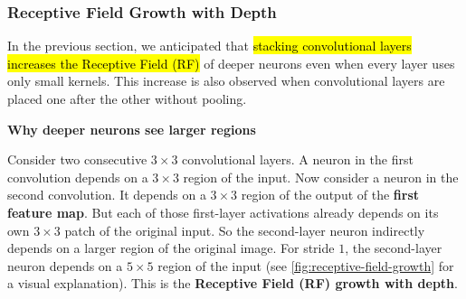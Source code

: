 \subsubsection{Receptive Field Growth with Depth}\label{sec:receptive-field-growth-with-depth}

In the previous section, we anticipated that \hl{stacking convolutional layers increases the Receptive Field (RF)} of deeper neurons even when every layer uses only small kernels. This increase is also observed when convolutional layers are placed one after the other without pooling.

\highspace
\begin{flushleft}
    \textcolor{Green3}{ \textbf{Why deeper neurons see larger regions}}
\end{flushleft}
Consider two consecutive $3\times3$ convolutional layers. A neuron in the first convolution depends on a $3 \times 3$ region of the input. Now consider a neuron in the second convolution. It depends on a $3 \times 3$ region of the output of the \textbf{first feature map}. But each of those first-layer activations already depends on its own $3\times3$ patch of the original input. So the second-layer neuron indirectly depends on a larger region of the original image. For stride $1$, the second-layer neuron depends on a $5\times5$ region of the input (see \autoref{fig:receptive-field-growth} for a visual explanation). This is the \textbf{Receptive Field (RF) growth with depth}.

